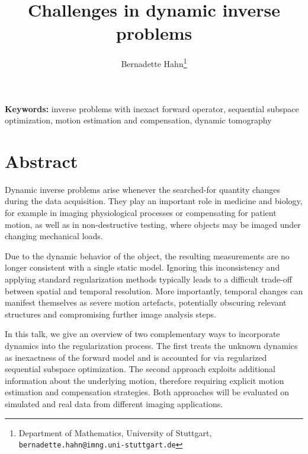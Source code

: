\documentclass[11pt]{article}
\title{{\bfseries Challenges in dynamic inverse problems}}
\author{
Bernadette Hahn\thanks{Department of Mathematics, University of Stuttgart,
\texttt{bernadette.hahn@imng.uni-stuttgart.de}}
}
\date{}
\begin{document}
\maketitle

\vspace{-1em}

\noindent
\textbf{Keywords:}
inverse problems with inexact forward operator, sequential subspace optimization, motion estimation and compensation, dynamic tomography

\vspace{0.5em}


\vspace{1em}

\section*{Abstract}
 

Dynamic inverse problems arise whenever the searched-for quantity changes during the data acquisition. They play an important role in medicine and biology, for example in imaging physiological processes or compensating for patient motion, as well as in non-destructive testing, where objects may be imaged under changing mechanical loads. 

Due to the dynamic behavior of the object, the resulting measurements are no longer consistent with a single static model. %
Ignoring this inconsistency and applying standard regularization methods typically leads to a difficult trade-off between spatial and temporal resolution. More importantly, temporal changes can manifest themselves as severe motion artefacts, potentially obscuring relevant structures and compromising further image analysis steps.

In this talk, we give an overview of two complementary ways to incorporate dynamics into the regularization process. The first treats the unknown dynamics as inexactness of the forward model and is accounted for via regularized sequential subspace optimization. The second approach exploits additional information about the underlying motion, therefore requiring explicit motion estimation and compensation strategies. Both approaches will be evaluated on simulated and real data from different imaging applications.
\vspace{1em}
\end{document}
